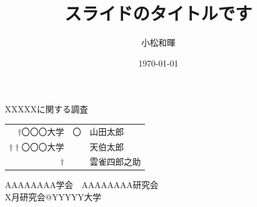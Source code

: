 

\def\SlideTitle{スライドのタイトルです}

\author[私です]{小松和暉}
\title[スライドの例です]{\SlideTitle}
\date{\today}

\begin{frame}{}

    \vspace{2cm}

    \begin{rightnote}
    \begin{center}
        {\LARGE
        XXXXXに関する調査
        }
    \end{center}
    \end{rightnote}

    \vfill

    \begin{center}
        \begin{tabular}{rrl}
            $\dagger$〇〇〇大学&〇&山田太郎 \\
            $\dagger\dagger$〇〇〇大学&&天伯太郎 \\
            $\dagger$&&雲雀四郎之助 \\
        \end{tabular}

        \vfill

        {
        AAAAAAAA学会　AAAAAAAA研究会\\
        X月研究会@YYYYY大学
        }
    \end{center}
\end{frame}


